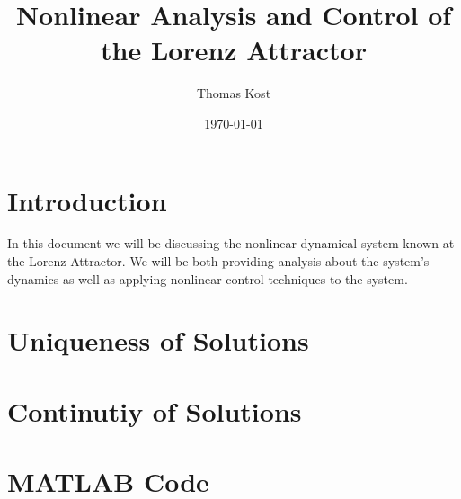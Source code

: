 \documentclass[12pt, letterpaper]{article}
\begin{document}
	\title{\vspace{-1in}Nonlinear Analysis and Control of the Lorenz Attractor}
	\author{Thomas Kost}
	\date{\today}
	\maketitle
	\tableofcontents
	\section{Introduction}
	In this document we will be discussing the nonlinear dynamical system known at the Lorenz Attractor. We will be both providing analysis about the system's dynamics as well as applying nonlinear control techniques to the system. 
	
	
	\section{Uniqueness of Solutions}
	\section{Continutiy of Solutions}
	\appendix
	\section{MATLAB Code}
\end{document}
